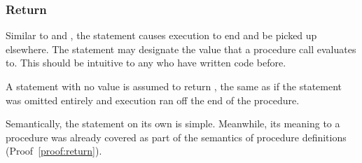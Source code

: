 \begin{prooftree}
\end{prooftree}

\begin{prooftree}
\end{prooftree}

\begin{prooftree}
\end{prooftree}

\begin{prooftree}
\end{prooftree}

\subsubsection{Return}

Similar to  and , the  statement causes execution
to end and be picked up elsewhere. The  statement may designate the value
that a procedure call evaluates to. This should be intuitive to any who have written
code before.

A  statement with no value is assumed to return , the same as if
the  statement was omitted entirely and execution ran off the end of the
procedure.

\begin{bnf*}
\end{bnf*}

Semantically, the  statement on its own is simple. Meanwhile, its meaning
to a procedure was already covered as part of the semantics of procedure definitions
(Proof~\ref{proof:return}).

